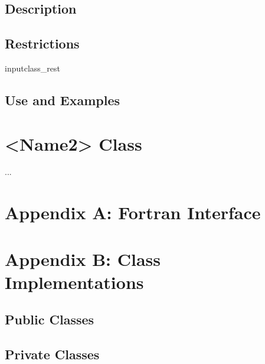 \documentclass[]{article}
\begin{document}
\subsection{Description}


\subsection{Restrictions}
input{class_rest}

\subsection{Use and Examples}
 

\newpage
\section{<Name2> Class} ...



 


\newpage
\setcounter{section}{1}
\renewcommand{\thesection}{\Alph{section}}
\renewcommand{\thesubsection}{\thesection\arabic{subsection}}

\section*{Appendix A:  Fortran Interface}

%

\newpage
\setcounter{section}{2}
\renewcommand{\thesection}{\Alph{section}}
\renewcommand{\thesubsection}{\thesection\arabic{subsection}}

\section*{Appendix B:  Class Implementations}

\subsection{Public Classes}

%

\subsection{Private Classes}

%
\end{document}
